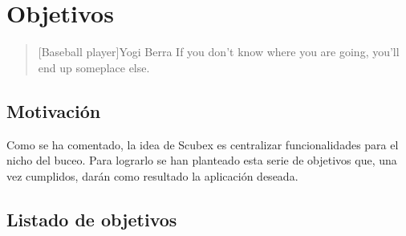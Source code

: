 \chapter{Objetivos}

\begin{quotation}[Baseball player]{Yogi Berra}
If you don't know where you are going, you'll end up someplace else.
\end{quotation}

\begin{abstract}
Visto el contexto, se formalizan los objetivos de la app de forma concreta. ¿Hacía quien esta dirigida la aplicación? ¿Qué funcionalidades tendrá? ¿Qué tecnologías se van a usar? ¿Qué se va a conseguir con el proyecto?
\end{abstract}

\section{Motivación}
Como se ha comentado, la idea de Scubex es centralizar funcionalidades para el nicho del buceo. Para lograrlo se han planteado esta serie de objetivos que, una vez cumplidos, darán como resultado la aplicación deseada.

\section{Listado de objetivos}

